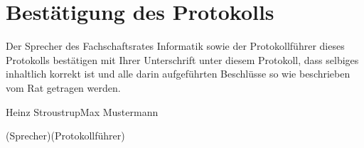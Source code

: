 \documentclass[a4paper, 11pt]{article} %
\newcommand{\abstimmung}[4]{
	\newcounter{summe}
	\setcounter{summe}{#3}
	\addtocounter{summe}{#4}
	\begin{flushleft}
		#1\\
	Es wird über den Antrag abgestimmt.
	\end{flushleft}
	\ifthenelse{\equal{#3}{0}\AND\equal{#4}{0}}{
	\begin{center}
		\textbf{Der Antrag wird einstimmig angenommen.}
	\end{center}
	}{
	\begin{center}
		#2 \ifthenelse{\equal{#2}{1}}{Stimme}{Stimmen} dafür, #3 \ifthenelse{\equal{#3}{1}}{Stimme}{Stimmen} dagegen, #4 \ifthenelse{\equal{#42}{1}}{Enthaltung}{Enthaltungen}\\
		\ifthenelse{#2>\value{summe}}{
		\textbf{Der Antrag ist somit angenommen.}
		}{
		\textbf{Der Antrag ist somit abgelehnt.}
		}
	\end{center}
	}  
}
\newcommand{\protokoller}{Max Mustermann}
\newcommand{\fsiPresident}{Heinz Stroustrup}
\begin{document}

\pagebreak
\section{Bestätigung des Protokolls}
Der Sprecher des Fachschaftsrates Informatik sowie der Protokollführer dieses Protokolls bestätigen mit Ihrer Unterschrift unter diesem Protokoll, dass selbiges inhaltlich korrekt ist und alle darin aufgeführten Beschlüsse so wie beschrieben vom Rat getragen werden.
\\

\vspace{3.5cm}
\hrulefill \hfill \hrulefill

\fsiPresident \hfill \protokoller

{\footnotesize (Sprecher)\hfill (Protokollführer)}
\end{document}
